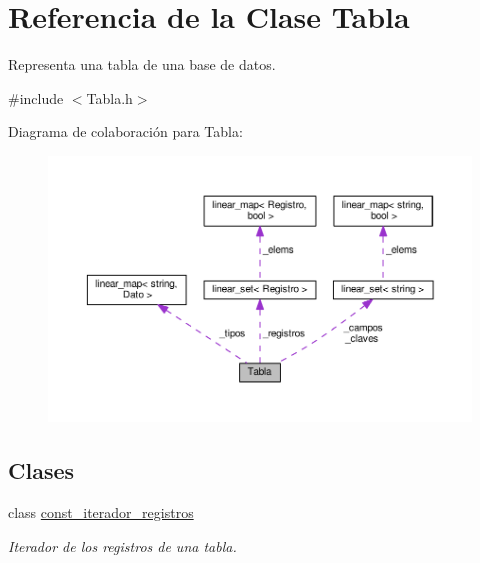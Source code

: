 \hypertarget{classTabla}{\section{Referencia de la Clase Tabla}
\label{classTabla}
}


Representa una tabla de una base de datos.  




{\ttfamily \#include $<$Tabla.\-h$>$}



Diagrama de colaboración para Tabla\-:\nopagebreak
\begin{figure}[H]
\begin{center}
\leavevmode
\includegraphics[width=350pt]{classTabla__coll__graph}
\end{center}
\end{figure}
\subsection*{Clases}
\begin{DoxyCompactItemize}
\item 
class \hyperlink{classTabla_1_1const__iterador__registros}{const\-\_\-iterador\-\_\-registros}
\begin{DoxyCompactList}\small\item\em Iterador de los registros de una tabla. \end{DoxyCompactList}\end{DoxyCompactItemize}
